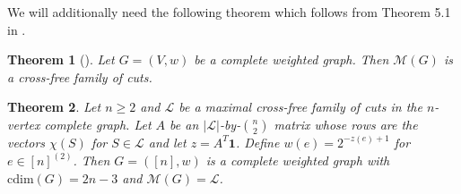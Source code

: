 \documentclass[10pt,a4paper]{article}
\newcommand{\Lcal}{\mathcal{L}}
\newcommand{\M}{\mathcal{M}}
\newcommand{\cd}{\mathrm{cdim}}
\newcommand{\1}{\mathbf{1}}
\newtheorem{theorem}{Theorem}
\theoremstyle{definition}
\begin{document}
We will additionally need the following theorem which follows from Theorem 5.1 in \cite{CR04}.
\begin{theorem}[\cite{CR04}]
\label{thm:cr_complete}
Let $G = (V,w)$ be a complete weighted graph.  Then $\M(G)$ is a cross-free family of cuts.
\end{theorem}


\begin{theorem}
\label{thm:explicit}
Let $n \ge 2$ and $\Lcal$ be a {maximal} cross-free family of cuts in the $n$-vertex complete graph.  Let
$A$ be an $|\Lcal|$-by-$\binom{n}{2}$ matrix whose rows are the vectors $\chi(S)$ for $S \in \Lcal$ and
let $z = A^T \1$.  Define $w(e) = 2^{-z(e)+1}$ for $e \in [n]^{(2)}$.
Then $G=([n],w)$ is a complete weighted graph with $\cd(G) = 2n-3$ and $\M(G) = \Lcal$.
\end{theorem}
\end{document}
